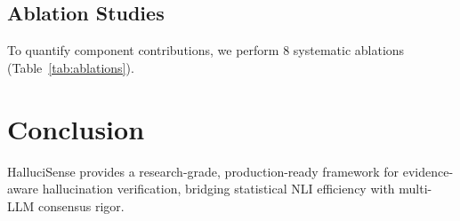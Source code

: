 \documentclass[conference]{IEEEtran}
\begin{document}
\subsection{Ablation Studies}
To quantify component contributions, we perform 8 systematic ablations (Table~\ref{tab:ablations}).



\section{Conclusion}
HalluciSense provides a research-grade, production-ready framework for evidence-aware hallucination verification, bridging statistical NLI efficiency with multi-LLM consensus rigor.



\end{document}
